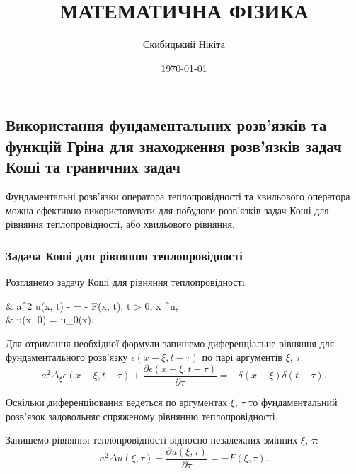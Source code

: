 

\title{{\Huge МАТЕМАТИЧНА ФІЗИКА}}
\author{Скибицький Нікіта}
\date{\today}





\tableofcontents

\setcounter{section}{4}
\setcounter{subsection}{2}
\setcounter{subsubsection}{5}
\setcounter{theorem}{29}
\setcounter{equation}{64}

\subsection{Використання фундаментальних розв'язків та \allowbreak функцій Гріна для знаходження розв'язків задач Коші та граничних задач}

Фундаментальні розв'язки оператора теплопровідності та хвильового оператора можна ефективно  використовувати для побудови розв'язків задач Коші для рівняння теплопровідності, або хвильового рівняння.

\subsubsection{Задача Коші для рівняння теплопровідності}

\begin{example}
	Розглянемо задачу Коші для рівняння теплопровідності:
	\begin{system}
		& a^2 \Delta u(x, t) -  = - F(x, t), \quad t > 0, \quad x \in \RR^n, \\
		& u(x, 0) = u_0(x).
	\end{system}
\end{example}

Для отримання необхідної формули запишемо диференціальне рівняння для фундаментального розв'язку $\epsilon(x - \xi, t - \tau)$ по парі аргументів $\xi$, $\tau$:
\begin{equation}
	\label{eq:3.3.2}
	a^2 \Delta_\xi \epsilon(x - \xi, t - \tau) + \frac{\partial \epsilon(x - \xi, t - \tau)}{\partial \tau} = - \delta(x - \xi) \delta(t - \tau).
\end{equation}

\begin{remark}
	Оскільки диференціювання ведеться по аргументах $\xi$, $\tau$ то фундаментальний розв'язок задовольняє спряженому рівнянню теплопровідності.
\end{remark}

Запишемо рівняння теплопровідності відносно незалежних змінних $\xi$, $\tau$:
\begin{equation}
	a^2 \Delta u(\xi, \tau) - \frac{\partial u(\xi, \tau)}{\partial \tau} = - F(\xi, \tau).
\end{equation}

